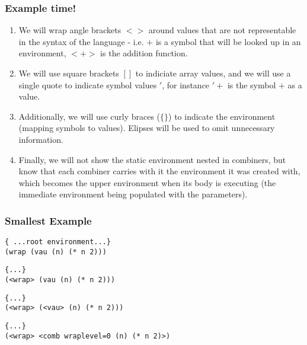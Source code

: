 \documentclass{beamer}
\begin{document}
\begin{frame}[fragile]
\frametitle{Example time!}
  \begin{enumerate}
    \item<1-> We will wrap angle brackets $<>$ around values that are not representable in the syntax of the language - i.e. $+$ is a symbol that will be looked up in an environment, $<+>$ is the addition function.
    \item<2->  We will use square brackets $[]$ to indiciate array values, and we will use a single quote to indicate symbol values $'$, for instance $'+$ is the symbol $+$ as a value.
	\item<3-> Additionally, we will use curly braces ($\{\}$) to indicate the environment (mapping symbols to values). Elipses will be used to omit unnecessary information.
	\item<4-> Finally, we will not show the static environment nested in combiners, but know that each combiner carries with it the environment it was created with, which becomes the upper environment when its body is executing (the immediate environment being populated with the parameters).
  \end{enumerate}
\end{frame}

\begin{frame}[fragile]
\frametitle{Smallest Example}
\footnotesize
\begin{verbatim}
{ ...root environment...}
(wrap (vau (n) (* n 2)))
\end{verbatim}
\end{frame}

\begin{frame}[fragile]
\footnotesize
\begin{verbatim}
{...}
(<wrap> (vau (n) (* n 2)))
\end{verbatim}
\end{frame}

\begin{frame}[fragile]
\footnotesize
\begin{verbatim}
{...}
(<wrap> (<vau> (n) (* n 2)))
\end{verbatim}
\end{frame}

\begin{frame}[fragile]
\footnotesize
\begin{verbatim}
{...}
(<wrap> <comb wraplevel=0 (n) (* n 2)>)
\end{verbatim}
\end{frame}
\end{document}
